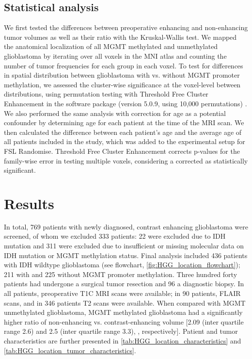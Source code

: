 \subsection{Statistical analysis}
We first tested the differences between preoperative enhancing and non-enhancing tumor volumes as well as their ratio with the Kruskal-Wallis test.
We mapped the anatomical localization of all \gls{MGMT} methylated and unmethylated glioblastoma by iterating over all voxels in the \gls{MNI} atlas and counting the number of tumor frequencies for each group in each voxel.
To test for differences in spatial distribution between glioblastoma with vs. without \gls{MGMT} promoter methylation, we assessed the cluster-wise significance at the voxel-level between distributions, using permutation testing with Threshold Free Cluster Enhancement \autocite{smith2009threshold} in the software package  (version 5.0.9, using 10,000 permutations) \autocite{winkler2014permutation}.
We also performed the same analysis with correction for age as a potential confounder by determining age for each patient at the time of the \gls{MRI} scan.
We then calculated the difference between each patient's age and the average age of all patients included in the study, which was added to the experimental setup for FSL Randomise.
Threshold Free Cluster Enhancement corrects p-values for the family-wise error in testing multiple voxels, considering a corrected  as statistically significant.


\section{Results}


In total, 769 patients with newly diagnosed, contrast enhancing glioblastoma were screened, of whom we excluded 333 patients: 22 were excluded due to \gls{IDH} mutation and 311 were excluded due to insufficient or missing molecular data on \gls{IDH} mutation or \gls{MGMT} methylation status.
Final analysis included 436 patients with \gls{IDH} wildtype glioblastoma (see flowchart, \cref{fig:HGG_location_flowchart}); 211 with and 225 without \gls{MGMT} promoter methylation.
Three hundred forty patients had undergone a surgical tumor resection and 96 a diagnostic biopsy.
In all patients, preoperative \gls{T1C} \gls{MRI} scans were available; in 90 patients, \gls{FLAIR} scans, and in 346 patients \gls{T2} scans were available.
When compared with \gls{MGMT} unmethylated glioblastoma, \gls{MGMT} methylated glioblastoma had a significantly higher ratio of non-enhancing vs. contrast-enhancing volume [2.09 (inter quartile range 2.6) and 2.5 (inter quartile range 3.3), , respectively].
Patient and tumor characteristics are further presented in \cref{tab:HGG_location_characteristics} and \cref{tab:HGG_location_tumor_characteristics}.


